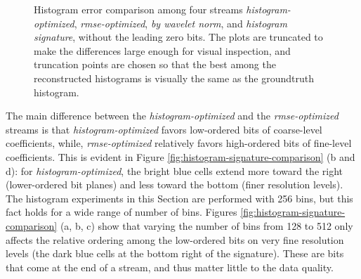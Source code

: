 \begin{figure}[h]
	\caption{Histogram error comparison among four streams \emph{histogram-optimized},
	\emph{rmse-optimized}, \emph{by wavelet norm}, and \emph{histogram signature}, without the leading
	zero bits. The plots are truncated to make the differences large enough for visual inspection, and
	truncation points are chosen so that the best among the reconstructed histograms is visually the
	same as the groundtruth histogram. }
	\label{fig:histogram-stream-comparison}
\end{figure}


The main difference between the \emph{histogram-optimized} and the \emph{rmse-optimized} streams is
that \emph{histogram-optimized} favors low-ordered bits of coarse-level coefficients, while,
\emph{rmse-optimized} relatively favors high-ordered bits of fine-level coefficients. This is
evident in Figure \ref{fig:histogram-signature-comparison} (b and d): for
\emph{histogram-optimized}, the bright blue cells extend more toward the right (lower-ordered bit
planes) and less toward the bottom (finer resolution levels). The histogram experiments in this
Section are performed with 256 bins, but this fact holds for a wide range of number of bins. Figures
\ref{fig:histogram-signature-comparison} (a, b, c) show that varying the number of bins from 128 to
512 only affects the relative ordering among the low-ordered bits on very fine resolution levels
(the dark blue cells at the bottom right of the signature). These are bits that come at the end of a
stream, and thus matter little to the data quality. 
 
